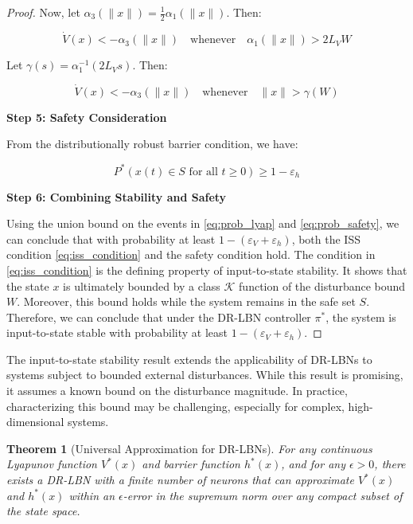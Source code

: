 \documentclass[11pt, oneside]{article}
\newtheorem{theorem}{Theorem}
\begin{document}
\begin{proof}
Now, let $\alpha_3(\|x\|) = \frac{1}{2}\alpha_1(\|x\|)$. Then:

\begin{equation}
    \dot{V}(x) < -\alpha_3(\|x\|) \quad \text{whenever} \quad \alpha_1(\|x\|) > 2L_V W
\end{equation}

Let $\gamma(s) = \alpha_1^{-1}(2L_V s)$. Then:

\begin{equation}
    \dot{V}(x) < -\alpha_3(\|x\|) \quad \text{whenever} \quad \|x\| > \gamma(W)
    \label{eq:iss_condition}
\end{equation}

\textbf{Step 5: Safety Consideration}

From the distributionally robust barrier condition, we have:

\begin{equation}
    P^*(x(t) \in S \text{ for all } t \geq 0) \geq 1 - \varepsilon_h
    \label{eq:prob_safety}
\end{equation}

\textbf{Step 6: Combining Stability and Safety}

Using the union bound on the events in \eqref{eq:prob_lyap} and \eqref{eq:prob_safety}, we can conclude that with probability at least $1 - (\varepsilon_V + \varepsilon_h)$, both the ISS condition \eqref{eq:iss_condition} and the safety condition hold. The condition in \eqref{eq:iss_condition} is the defining property of input-to-state stability. It shows that the state $x$ is ultimately bounded by a class $\mathcal{K}$ function of the disturbance bound $W$. Moreover, this bound holds while the system remains in the safe set $S$. Therefore, we can conclude that under the DR-LBN controller $\pi^*$, the system is input-to-state stable with probability at least $1 - (\varepsilon_V + \varepsilon_h)$.
\end{proof}

 The input-to-state stability result extends the applicability of DR-LBNs to systems subject to bounded external disturbances. While this result is promising, it assumes a known bound on the disturbance magnitude. In practice, characterizing this bound may be challenging, especially for complex, high-dimensional systems. 



\begin{theorem}[Universal Approximation for DR-LBNs]
For any continuous Lyapunov function $V^*(x)$ and barrier function $h^*(x)$, and for any $\epsilon > 0$, there exists a DR-LBN with a finite number of neurons that can approximate $V^*(x)$ and $h^*(x)$ within an $\epsilon$-error in the supremum norm over any compact subset of the state space.
\end{theorem}
\end{document}
